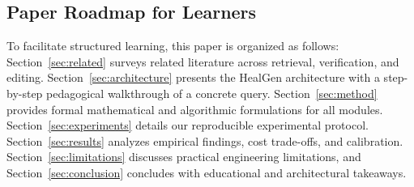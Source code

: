 \subsection{Paper Roadmap for Learners}
To facilitate structured learning, this paper is organized as follows:
Section~\ref{sec:related} surveys related literature across retrieval, verification, and editing.
Section~\ref{sec:architecture} presents the HealGen architecture with a step-by-step pedagogical walkthrough of a concrete query.
Section~\ref{sec:method} provides formal mathematical and algorithmic formulations for all modules.
Section~\ref{sec:experiments} details our reproducible experimental protocol.
Section~\ref{sec:results} analyzes empirical findings, cost trade-offs, and calibration.
Section~\ref{sec:limitations} discusses practical engineering limitations, and Section~\ref{sec:conclusion} concludes with educational and architectural takeaways.
